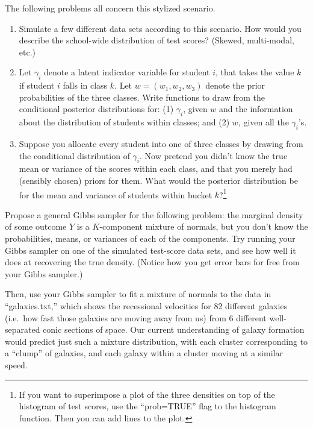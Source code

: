 \documentclass{mynotes}
\begin{document}
The following problems all concern this stylized scenario.
\begin{enumerate}
\item Simulate a few different data sets according to this scenario.  How would you describe the school-wide distribution of test scores? (Skewed, multi-modal, etc.)
\item Let $\gamma_i$ denote a latent indicator variable for student $i$, that takes the value $k$ if student $i$ falls in class $k$.  Let $w = (w_1, w_2, w_3)$ denote the prior probabilities of the three classes.  Write functions to draw from the conditional posterior distributions for: (1) $\gamma_i$, given $w$ and the information about the distribution of students within classes; and (2) $w$, given all the $\gamma_i$'s.
\item Suppose you allocate every student into one of three classes by drawing from the conditional distribution of $\gamma_i$.  Now pretend you didn't know the true mean or variance of the scores within each class, and that you merely had (sensibly chosen) priors for them.  What would the posterior distribution be for the mean and variance of students within bucket $k$?\footnote[][-3pc]{If you want to superimpose a plot of the three densities on top of the histogram of test scores, use the ``prob=TRUE'' flag to the histogram function.  Then you can add lines to the plot.}
\end{enumerate}
Propose a general Gibbs sampler for the following problem: the marginal density of some outcome $Y$ is a $K$-component mixture of normals, but you don't know the probabilities, means, or variances of each of the components.  Try running your Gibbs sampler on one of the simulated test-score data sets, and see how well it does at recovering the true density.  (Notice how you get error bars for free from your Gibbs sampler.) 

Then, use your Gibbs sampler to fit a mixture of normals to the data in ``galaxies.txt,'' which shows the recessional velocities for 82 different galaxies (i.e.~how fast those galaxies are moving away from us) from 6 different well-separated conic sections of space.  Our current understanding of galaxy formation would predict just such a mixture distribution, with each cluster corresponding to a ``clump'' of galaxies, and each galaxy within a cluster moving at a similar speed.
\end{document}
